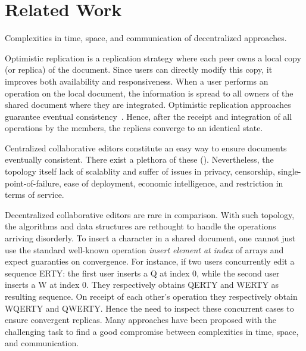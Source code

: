 \section{Related Work}
\label{sec:relatedwork}


\begin{table*}
  \centering
  
  \caption{\label{table:complexities}Complexities in time, space, and communication of decentralized approaches.}
\end{table*}


\begin{asparadesc}
\item[Optimistic replication] is a replication strategy where each peer owns a
  local copy (or replica) of the document. Since users can directly modify this
  copy, it improves both availability and responsiveness. When a user performs
  an operation on the local document, the information is spread to all owners of
  the shared document where they are integrated. Optimistic replication
  approaches guarantee eventual consistency~\cite{bailis2013eventual}. Hence,
  after the receipt and integration of all operations by the members, the
  replicas converge to an identical state.
\item[Centralized] collaborative editors constitute an easy way to ensure
  documents eventually consistent. There exist a plethora of these
  ().  Nevertheless, the topology itself lack of scalablity and
  suffer of issues in privacy, censorship, single-point-of-failure, ease of
  deployment, economic intelligence, and restriction in terms of service.
\item[Decentralized] collaborative editors are rare in comparison. With such
  topology, the algorithms and data structures are rethought to handle the
  operations arriving disorderly.  To insert a character in a shared document,
  one cannot just use the standard well-known operation \emph{insert element at
    index} of arrays and expect guaranties on convergence. For instance, if two
  users concurrently edit a sequence ERTY: the first user inserts a Q at index
  0, while the second user inserts a W at index 0. They respectively obtains
  QERTY and WERTY as resulting sequence. On receipt of each other's operation
  they respectively obtain WQERTY and QWERTY. Hence the need to inspect these
  concurrent cases to ensure convergent replicas.  Many approaches have been
  proposed with the challenging task to find a good compromise between
  complexities in time, space, and communication.

\end{asparadesc}
